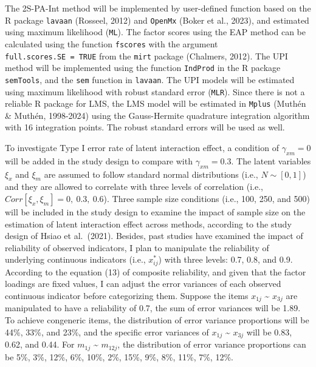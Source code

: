 \documentclass[
  11pt,
  man]{apa6}
\begin{document}
The 2S-PA-Int method will be implemented by user-defined function based on the R package \texttt{lavaan} (Rosseel, 2012) and \texttt{OpenMx} (Boker et al., 2023), and estimated using maximum likelihood (\texttt{ML}). The factor scores using the EAP method can be calculated using the function \texttt{fscores} with the argument \texttt{full.scores.SE\ =\ TRUE} from the \texttt{mirt} package (Chalmers, 2012). The UPI method will be implemented using the function \texttt{IndProd} in the R package \texttt{semTools}, and the \texttt{sem} function in \texttt{lavaan}. The UPI models will be estimated using maximum likelihood with robust standard error (\texttt{MLR}). Since there is not a reliable R package for LMS, the LMS model will be estimated in \texttt{Mplus} (Muthén \& Muthén, 1998-2024) using the Gauss-Hermite quadrature integration algorithm with 16 integration points. The robust standard errors will be used as well.

To investigate Type I error rate of latent interaction effect, a condition of \(\gamma_{xm} = 0\) will be added in the study design to compare with \(\gamma_{xm} = 0.3\). The latent variables \(\xi_{x}\) and \(\xi_{m}\) are assumed to follow standard normal distributions (i.e., \(N \sim [0,1]\)) and they are allowed to correlate with three levels of correlation (i.e., \(Corr[\xi_{x}, \xi_{m}] = 0, \ 0.3, \ 0.6\)). Three sample size conditions (i.e., 100, 250, and 500) will be included in the study design to examine the impact of sample size on the estimation of latent interaction effect across methods, according to the study design of Hsiao et al.~(2021). Besides, past studies have examined the impact of reliability of observed indicators, I plan to manipulate the reliability of underlying continuous indicators (i.e., \(x_{ij}^*\)) with three levels: 0.7, 0.8, and 0.9. According to the equation (13) of composite reliability, and given that the factor loadings are fixed values, I can adjust the error variances of each observed continuous indicator before categorizing them. Suppose the items \(x_{1j}\) \textasciitilde{} \(x_{3j}\) are manipulated to have a reliability of 0.7, the sum of error variances will be 1.89. To achieve congeneric items, the distribution of error variance proportions will be 44\%, 33\%, and 23\%, and the specific error variances of \(x_{1j}\) \textasciitilde{} \(x_{3j}\) will be 0.83, 0.62, and 0.44. For \(m_{1j}\) \textasciitilde{} \(m_{12j}\), the distribution of error variance proportions can be 5\%, 3\%, 12\%, 6\%, 10\%, 2\%, 15\%, 9\%, 8\%, 11\%, 7\%, 12\%.
\end{document}
